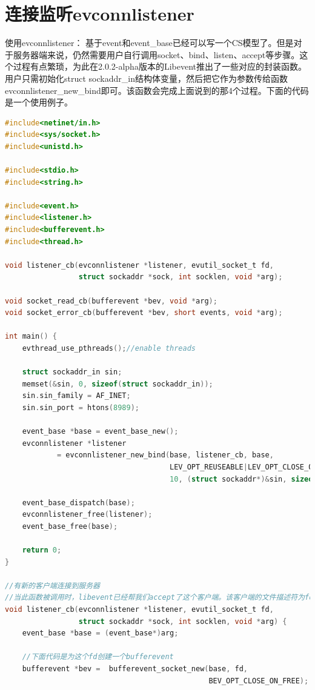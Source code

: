 \documentclass[11pt,a4paper]{article}
\begin{document}
\newpage

\section{连接监听evconnlistener}
使用evconnlistener：
基于event和event\_base已经可以写一个CS模型了。但是对于服务器端来说，仍然需要用户自行调用socket、bind、listen、accept等步骤。这个过程有点繁琐，为此在2.0.2-alpha版本的Libevent推出了一些对应的封装函数。
用户只需初始化struct sockaddr\_in结构体变量，然后把它作为参数传给函数evconnlistener\_new\_bind即可。该函数会完成上面说到的那4个过程。下面的代码是一个使用例子。
\begin{lstlisting}[language=C]
#include<netinet/in.h>
#include<sys/socket.h>
#include<unistd.h>

#include<stdio.h>
#include<string.h>

#include<event.h>
#include<listener.h>
#include<bufferevent.h>
#include<thread.h>

void listener_cb(evconnlistener *listener, evutil_socket_t fd,
                 struct sockaddr *sock, int socklen, void *arg);

void socket_read_cb(bufferevent *bev, void *arg);
void socket_error_cb(bufferevent *bev, short events, void *arg);

int main() {
    evthread_use_pthreads();//enable threads

    struct sockaddr_in sin;
    memset(&sin, 0, sizeof(struct sockaddr_in));
    sin.sin_family = AF_INET;
    sin.sin_port = htons(8989);

    event_base *base = event_base_new();
    evconnlistener *listener
            = evconnlistener_new_bind(base, listener_cb, base,
                                      LEV_OPT_REUSEABLE|LEV_OPT_CLOSE_ON_FREE | LEV_OPT_THREADSAFE,
                                      10, (struct sockaddr*)&sin, sizeof(struct sockaddr_in));

    event_base_dispatch(base);
    evconnlistener_free(listener);
    event_base_free(base);

    return 0;
}

//有新的客户端连接到服务器
//当此函数被调用时，libevent已经帮我们accept了这个客户端。该客户端的文件描述符为fd
void listener_cb(evconnlistener *listener, evutil_socket_t fd,
                 struct sockaddr *sock, int socklen, void *arg) {
    event_base *base = (event_base*)arg;

	//下面代码是为这个fd创建一个bufferevent
    bufferevent *bev =  bufferevent_socket_new(base, fd,
                                               BEV_OPT_CLOSE_ON_FREE);


\end{lstlisting}
\end{document}
